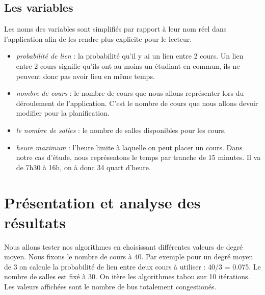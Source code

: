 \documentclass[a4paper,11pt]{article}
\begin{document}
	\subsection{Les variables}
		Les noms des variables sont simplifiés par rapport à leur nom réel dans l'application afin de les rendre plus explicite pour le lecteur.
		\begin{itemize}
			\item \textit{probabilité de lien} : la probabilité qu'il y ai un lien entre 2 cours. Un lien entre 2 cours signifie qu'ils ont au moins un étudiant en commun, ils ne peuvent donc pas avoir lieu en même temps.
			\item \textit{nombre de cours} : le nombre de cours que nous allons représenter lors du déroulement de l'application. C'est le nombre de cours que nous allons devoir modifier pour la planification.
			\item  \textit{le nombre de salles} : le nombre de salles disponibles pour les cours.
			\item \textit{heure maximum} : l'heure limite à laquelle on peut placer un cours. Dans notre cas d'étude, nous représentons le temps par tranche de 15 minutes. Il va de 7h30 à 16h, on à donc 34 quart d'heure.
		\end{itemize}

\section{Présentation et analyse des résultats}
	Nous allons tester nos algorithmes en choisissant différentes valeurs de degré moyen. Nous fixons le nombre de cours à 40. Par exemple pour un degré moyen de 3 on calcule la probabilité de lien entre deux cours à utiliser : 40/3 = 0.075. Le nombre de salles est fixé à 30. On itère les algorithmes tabou sur 10 itérations. Les valeurs affichées sont le nombre de bus totalement congestionés.\\
	
\end{document}
